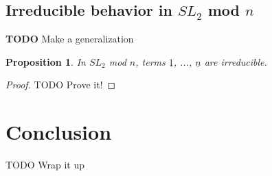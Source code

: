 \documentclass[a4paper,draft]{amsproc}
\theoremstyle{plain}
\newtheorem{prop}{Proposition}[section]
\theoremstyle{definition}
\theoremstyle{remark}
\numberwithin{equation}{section}
\begin{document}
\subsection{Irreducible behavior in $SL_{2}$ mod $n$}
\textbf{TODO} Make a generalization
\begin{prop}
 In $SL_{2}$ mod $n$, terms $\underline{1}$, ..., $\underline{n}$ are irreducible. 
\end{prop}
\begin{proof}
{TODO} Prove it!
\end{proof}

\section{Conclusion}
{TODO} Wrap it up

\end{document}
